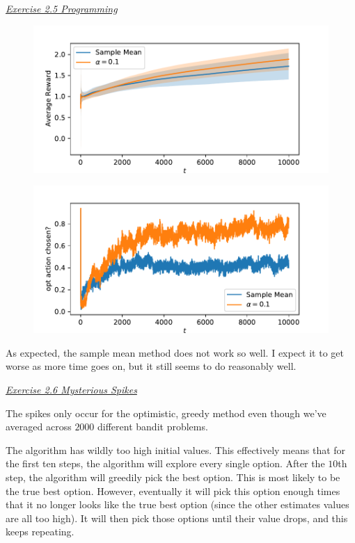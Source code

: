 \documentclass{article}
\newcommand{\myq}[1]{%
	\vspace{1em}
	\noindent\underline{\emph{Exercise #1}}\vspace{0.25em}\linebreak
}
\begin{document}
\myq{2.5 Programming}
\begin{figure}[H]
	\includegraphics{rewards.pdf}
	\centering
\end{figure}

\begin{figure}[H]
	\includegraphics{choices.pdf}
	\centering
\end{figure}

As expected, the sample mean method does not work so well. I expect it to get worse as more time goes on, but it still seems to do reasonably well. 

\myq{2.6 Mysterious Spikes}
The spikes only occur for the optimistic, greedy method even though we've averaged across $2000$ different bandit problems. 

The algorithm has wildly too high initial values. This effectively means that for the first ten steps, the algorithm will explore every single option. After the $10$th step, the algorithm will greedily pick the best option. This is most likely to be the true best option. However, eventually it will pick this option enough times that it no longer looks like the true best option (since the other estimates values are all too high). It will then pick those options until their value drops, and this keeps repeating. 
\end{document}
